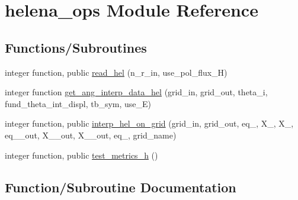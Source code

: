\hypertarget{namespacehelena__ops}{}\section{helena\+\_\+ops Module Reference}
\label{namespacehelena__ops}
\subsection*{Functions/\+Subroutines}
\begin{DoxyCompactItemize}
\item 
integer function, public \hyperlink{namespacehelena__ops_ae05ba1182eb002d93c27ca4ff7ab8cf2}{read\+\_\+hel} (n\+\_\+r\+\_\+in, use\+\_\+pol\+\_\+flux\+\_\+H)
\item 
integer function \hyperlink{namespacehelena__ops_ab1329afe5af2ff92d96f4be15a096b38}{get\+\_\+ang\+\_\+interp\+\_\+data\+\_\+hel} (grid\+\_\+in, grid\+\_\+out, theta\+\_\+i, fund\+\_\+theta\+\_\+int\+\_\+displ, tb\+\_\+sym, use\+\_\+E)
\item 
integer function, public \hyperlink{namespacehelena__ops_a7796861de18ae7ac9c3aa07a8628be38}{interp\+\_\+hel\+\_\+on\+\_\+grid} (grid\+\_\+in, grid\+\_\+out, eq\+\_, X\+\_, X\+\_, eq\+\_\+\_\+out, X\+\_\+\_\+out, X\+\_\+\_\+out, eq\+\_, grid\+\_\+name)
\item 
integer function, public \hyperlink{namespacehelena__ops_a0f156b3653264fb016d6d311eb59114c}{test\+\_\+metrics\+\_\+h} ()
\end{DoxyCompactItemize}


\subsection{Function/\+Subroutine Documentation}
\mbox{\label{namespacehelena__ops_ab1329afe5af2ff92d96f4be15a096b38}} 
